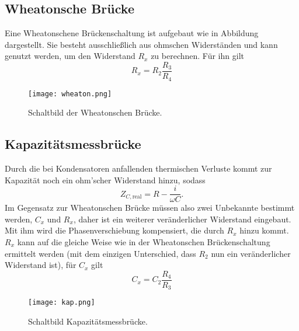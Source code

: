 \subsection{Wheatonsche Brücke}
    Eine Wheatonschene Brückenschaltung ist aufgebaut wie in Abbildung %
    dargestellt. Sie besteht ausschließlich aus ohmschen Widerständen und kann genutzt werden,
    um den Widerstand $R_x$ zu berechnen. Für ihn gilt
    \begin{equation}
        R_x = R_2 \frac{R_3}{R_4}
    \end{equation}

    \begin{figure}
        \centering
        \texttt{[image: wheaton.png]}
        \caption{Schaltbild der Wheatonschen Brücke.}
        \label{fig:kap}
    \end{figure}
        

\subsection{Kapazitätsmessbrücke}
    Durch die bei Kondensatoren anfallenden thermischen Verluste kommt zur Kapazität noch ein ohm'scher Widerstand hinzu, sodass
    \begin{equation}
        Z_{C,\text{real}} = R - \frac{i}{\omega C} .
    \end{equation}
    Im Gegensatz zur Wheatonschen Brücke müssen also zwei Unbekannte bestimmt werden, $C_x$ und $R_x$, daher ist ein weiterer 
    veränderlicher Widerstand eingebaut. Mit ihm wird die Phasenverschiebung kompensiert, die durch $R_x$ hinzu kommt.\\
    $R_x$ kann auf die gleiche Weise wie in der Wheatonschen Brückenschaltung ermittelt werden (mit dem einzigen Unterschied,
    dass $R_2$ nun ein veränderlicher Widerstand ist), für $C_x$ gilt
    \begin{equation}
        C_x = C_2 \frac{R_4}{R_3}
    \end{equation}

    \begin{figure}
        \centering
        \texttt{[image: kap.png]}
        \caption{Schaltbild Kapazitätsmessbrücke.}
        \label{fig:kap}
    \end{figure}

